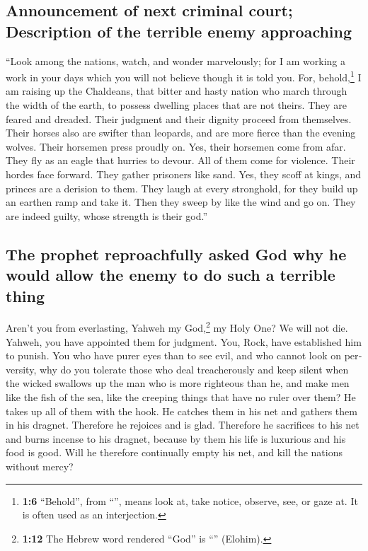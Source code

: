 \begin{paracol}{2}
\begin{otherlanguage}{english}
\hypertarget{announcement-of-next-criminal-court-description-of-the-terrible-enemy-approaching}{%
\subsection{Announcement of next criminal court; Description of the
terrible enemy
approaching}\label{announcement-of-next-criminal-court-description-of-the-terrible-enemy-approaching}}

 ``Look among the nations, watch, and wonder marvelously;
for I am working a work in your days which you will not believe though
it is told you.  For, behold,\footnote{\textbf{1:6}
  ``Behold'', from ``'', means look at, take notice,
  observe, see, or gaze at. It is often used as an interjection.} I am
raising up the Chaldeans, that bitter and hasty nation who march through
the width of the earth, to possess dwelling places that are not theirs.
 They are feared and dreaded. Their judgment and their
dignity proceed from themselves.  Their horses also are
swifter than leopards, and are more fierce than the evening wolves.
Their horsemen press proudly on. Yes, their horsemen come from afar.
They fly as an eagle that hurries to devour.  All of them
come for violence. Their hordes face forward. They gather prisoners like
sand.  Yes, they scoff at kings, and princes are a
derision to them. They laugh at every stronghold, for they build up an
earthen ramp and take it.  Then they sweep by like the
wind and go on. They are indeed guilty, whose strength is their god.''

\hypertarget{the-prophet-reproachfully-asked-god-why-he-would-allow-the-enemy-to-do-such-a-terrible-thing}{%
\subsection{The prophet reproachfully asked God why he would allow the
enemy to do such a terrible
thing}\label{the-prophet-reproachfully-asked-god-why-he-would-allow-the-enemy-to-do-such-a-terrible-thing}}

 Aren't you from everlasting, Yahweh my God,\footnote{\textbf{1:12}
  The Hebrew word rendered ``God'' is ``'' (Elohim).} my
Holy One? We will not die. Yahweh, you have appointed them for judgment.
You, Rock, have established him to punish.  You who have
purer eyes than to see evil, and who cannot look on perversity, why do
you tolerate those who deal treacherously and keep silent when the
wicked swallows up the man who is more righteous than he,
 and make men like the fish of the sea, like the creeping
things that have no ruler over them?  He takes up all of
them with the hook. He catches them in his net and gathers them in his
dragnet. Therefore he rejoices and is glad.  Therefore he
sacrifices to his net and burns incense to his dragnet, because by them
his life is luxurious and his food is good.  Will he
therefore continually empty his net, and kill the nations without mercy?


\end{otherlanguage}
\end{paracol}

